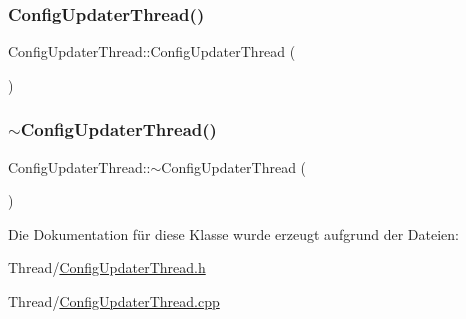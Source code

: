 \subsubsection{\texorpdfstring{Config\+Updater\+Thread()}{ConfigUpdaterThread()}}
{\footnotesize\ttfamily Config\+Updater\+Thread\+::\+Config\+Updater\+Thread (\begin{DoxyParamCaption}{ }\end{DoxyParamCaption})}

\hypertarget{class_config_updater_thread_a76b9050ee3e35fc85fd1b12eb2cb3ca4}{}\label{class_config_updater_thread_a76b9050ee3e35fc85fd1b12eb2cb3ca4} 
\subsubsection{\texorpdfstring{$\sim$\+Config\+Updater\+Thread()}{~ConfigUpdaterThread()}}
{\footnotesize\ttfamily Config\+Updater\+Thread\+::$\sim$\+Config\+Updater\+Thread (\begin{DoxyParamCaption}{ }\end{DoxyParamCaption})\hspace{0.3cm}{\ttfamily [virtual]}}



Die Dokumentation für diese Klasse wurde erzeugt aufgrund der Dateien\+:\begin{DoxyCompactItemize}
\item 
Thread/\hyperlink{_config_updater_thread_8h}{Config\+Updater\+Thread.\+h}\item 
Thread/\hyperlink{_config_updater_thread_8cpp}{Config\+Updater\+Thread.\+cpp}\end{DoxyCompactItemize}
